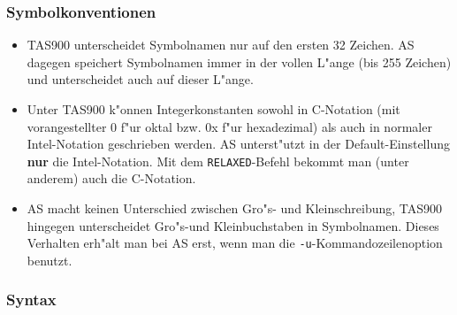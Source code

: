 \documentclass[12pt,a4paper,twoside]{report}
\newcommand{\bb}[1]{{\bf #1}}
\newcommand{\tty}[1]{{\tt #1}}
\begin{document}
{\subsubsection{Symbolkonventionen}

\begin{itemize}
\item{TAS900 unterscheidet Symbolnamen nur auf den ersten 32 Zeichen.
      AS dagegen speichert Symbolnamen immer in der vollen L"ange (bis
      255 Zeichen) und unterscheidet auch auf dieser L"ange.}
\item{Unter TAS900 k"onnen Integerkonstanten sowohl in C-Notation (mit
      vorangestellter 0 f"ur oktal bzw. 0x f"ur hexadezimal) als auch in
      normaler Intel-Notation geschrieben werden.  AS unterst"utzt in der
      Default-Einstellung \bb{nur} die Intel-Notation.  Mit dem
      \tty{RELAXED}-Befehl bekommt man (unter anderem) auch die C-Notation.}
\item{AS macht keinen Unterschied zwischen Gro"s- und Kleinschreibung,
      TAS900 hingegen unterscheidet Gro"s-und Kleinbuchstaben in
      Symbolnamen.  Dieses Verhalten erh"alt man bei AS erst, wenn man
      die \tty{-u}-Kommandozeilenoption benutzt.}
\end{itemize}

\subsubsection{Syntax}

}
\end{document}
